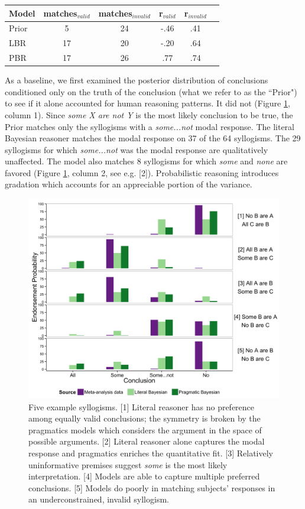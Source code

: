 \documentclass[10pt,letterpaper]{article}
\begin{document}
\begin{tabular}{l*{4}{c}r}
Model              & matches$_{valid}$ & matches$_{invalid}$ & r$_{valid}$ & r$_{invalid}$  \\
\hline
Prior & 5 & 24 & -.46 & .41  \\
LBR & 17 & 20 & -.20 & .64  \\
PBR & 17 & 26 & .77 & .74 &   \\
\end{tabular}

As a baseline, we first examined the posterior distribution of conclusions conditioned only on the truth of the conclusion (what we refer to as the ``Prior") to see if it alone accounted for human reasoning patterns. It did not (Figure \ref{fig:barplots}, column 1). Since \emph{some X are not Y} is the most likely conclusion to be true, the Prior matches only the syllogisms with a \emph{some...not} modal response. 
%
The literal Bayesian reasoner matches the modal response on 37 of the 64 syllogisms. The 29 syllogisms for which \emph{some...not} was the modal response are qualitatively unaffected. The model also matches 8 syllogisms for which \emph{some} and \emph{none} are favored (Figure \ref{fig:barplots}, column 2, see e.g. [2]). Probabilistic reasoning introduces gradation which accounts for an appreciable portion of the variance.
%
\begin{figure}
\centering
    \includegraphics[width=\columnwidth]{multibar_fig1}
    \caption{Five example syllogisms. 
    [1] Literal reasoner  has no preference among equally valid conclusions; the symmetry is broken by the pragmatics models which considers the argument in the space of possible arguments.     
    [2] Literal reasoner alone captures the modal response and pragmatics enriches the quantitative fit.     
    [3] Relatively uninformative premises suggest \emph{some} is the most likely interpretation. 
    [4] Models are able to capture multiple preferred conclusions. 
    [5] Models do poorly in matching subjects' responses in an underconstrained, invalid syllogism.}
  \label{fig:barplots}
\end{figure}
\end{document}
